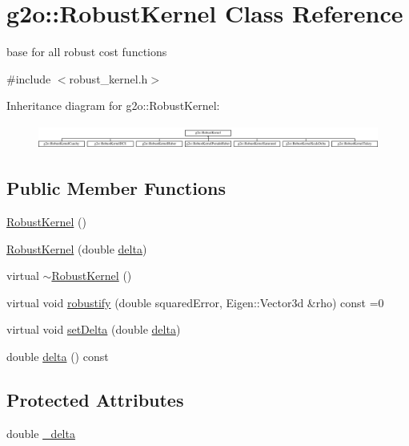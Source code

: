 \hypertarget{classg2o_1_1_robust_kernel}{}\section{g2o\+:\+:Robust\+Kernel Class Reference}
\label{classg2o_1_1_robust_kernel}


base for all robust cost functions  




{\ttfamily \#include $<$robust\+\_\+kernel.\+h$>$}

Inheritance diagram for g2o\+:\+:Robust\+Kernel\+:\begin{figure}[H]
\begin{center}
\leavevmode
\includegraphics[height=0.804020cm]{classg2o_1_1_robust_kernel}
\end{center}
\end{figure}
\subsection*{Public Member Functions}
\begin{DoxyCompactItemize}
\item 
\mbox{\hyperlink{classg2o_1_1_robust_kernel_ae4f7b1e9d0c9925f98c0b828f554a8ab}{Robust\+Kernel}} ()
\item 
\mbox{\hyperlink{classg2o_1_1_robust_kernel_aabd6883d9c5e33b567453585a80c7ad8}{Robust\+Kernel}} (double \mbox{\hyperlink{classg2o_1_1_robust_kernel_affb1dacfd8507540281ff3af2ae6eeb8}{delta}})
\item 
virtual \mbox{\hyperlink{classg2o_1_1_robust_kernel_a2d0512646603b993efdfc782df0e6df2}{$\sim$\+Robust\+Kernel}} ()
\item 
virtual void \mbox{\hyperlink{classg2o_1_1_robust_kernel_ab47b071a0cfe466be063f0104bc41d0f}{robustify}} (double squared\+Error, Eigen\+::\+Vector3d \&rho) const =0
\item 
virtual void \mbox{\hyperlink{classg2o_1_1_robust_kernel_a8d85269635c436fca51324d7cb16a798}{set\+Delta}} (double \mbox{\hyperlink{classg2o_1_1_robust_kernel_affb1dacfd8507540281ff3af2ae6eeb8}{delta}})
\item 
double \mbox{\hyperlink{classg2o_1_1_robust_kernel_affb1dacfd8507540281ff3af2ae6eeb8}{delta}} () const
\end{DoxyCompactItemize}
\subsection*{Protected Attributes}
\begin{DoxyCompactItemize}
\item 
double \mbox{\hyperlink{classg2o_1_1_robust_kernel_a4b03953a6e7bfca64efea37fb98548aa}{\+\_\+delta}}
\end{DoxyCompactItemize}


